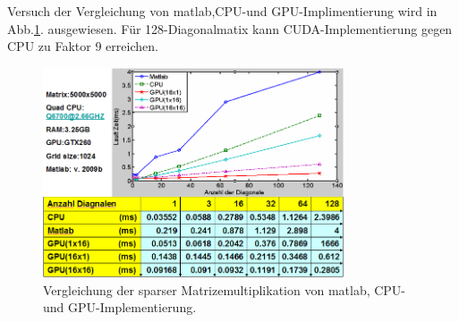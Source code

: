 

Versuch der Vergleichung von matlab,CPU-und GPU-Implimentierung wird in Abb.\ref{sparse_ergebnis}. ausgewiesen. Für 128-Diagonalmatix kann CUDA-Implementierung gegen CPU zu Faktor 9 erreichen.


\begin{figure}[htbp]
\includegraphics[width=3.5in]{../xby/pic//sparse_ergebnis}
\caption{Vergleichung der sparser Matrizemultiplikation von matlab, CPU-und GPU-Implementierung.}
\label{sparse_ergebnis}
\end{figure}